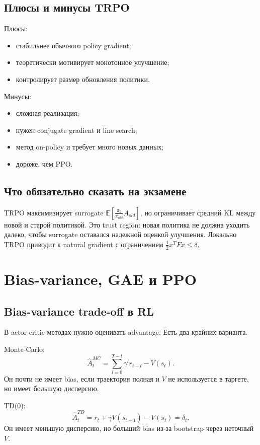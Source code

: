 \documentclass[11pt,a4paper]{article}
\newcommand{\E}{\mathbb{E}}
\newcommand{\1}{\mathbf{1}}
\begin{document}
\subsection*{Плюсы и минусы TRPO}
Плюсы:
\begin{itemize}
    \item стабильнее обычного policy gradient;
    \item теоретически мотивирует монотонное улучшение;
    \item контролирует размер обновления политики.
\end{itemize}
Минусы:
\begin{itemize}
    \item сложная реализация;
    \item нужен conjugate gradient и line search;
    \item метод on-policy и требует много новых данных;
    \item дороже, чем PPO.
\end{itemize}

\subsection*{Что обязательно сказать на экзамене}
TRPO максимизирует surrogate $\E[\frac{\pi_\theta}{\pi_{old}}A_{old}]$, но ограничивает средний KL между новой и старой политикой. Это trust region: новая политика не должна уходить далеко, чтобы surrogate оставался надежной оценкой улучшения. Локально TRPO приводит к natural gradient с ограничением $\frac12x^TFx\le\delta$.

\newpage
\section{Bias-variance, GAE и PPO}

\subsection*{Bias-variance trade-off в RL}
В actor-critic методах нужно оценивать advantage. Есть два крайних варианта.

Monte-Carlo:
\[
    \hat A_t^{MC}=\sum_{l=0}^{T-t}\gamma^l r_{t+l}-V(s_t).
\]
Он почти не имеет bias, если траектория полная и $V$ не используется в таргете, но имеет большую дисперсию.

TD(0):
\[
    \hat A_t^{TD}=r_t+\gamma V(s_{t+1})-V(s_t)=\delta_t.
\]
Он имеет меньшую дисперсию, но больший bias из-за bootstrap через неточный $V$.
\end{document}
